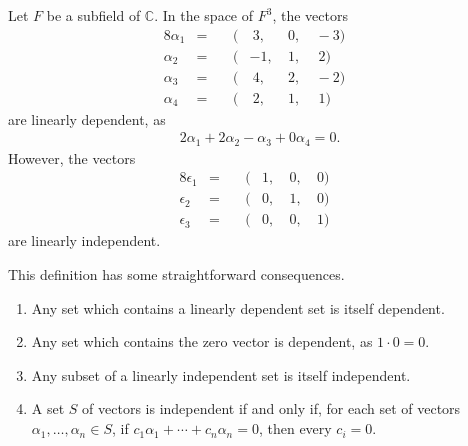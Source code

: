 \documentclass[12pt]{article}
\begin{document}
\begin{exm}
  Let $F$ be a subfield of $\mathbb{C}$. In the space of $F^3$, the vectors
  \begin{alignat*}{8}
    \alpha_1 &=&\ &(&\ 3,&\ 0,&\ -3)&\\
    \alpha_2 &=&\ &(&-1,&\ 1,&\ \ 2)&\\
    \alpha_3 &=&\ &(&\ 4,&\ 2,&\ -2)&\\
    \alpha_4 &=&\ &(&\ 2,&\ 1,&\ \ 1)&
  \end{alignat*}
  are linearly dependent, as
  \begin{align*}
    2\alpha_1 + 2\alpha_2 - \alpha_3 + 0\alpha_4 = 0.
  \end{align*}
  However, the vectors
  \begin{alignat*}{8}
    \epsilon_1 &=&\ &(&1,&\ 0,&\ 0)&\\
    \epsilon_2 &=&\ &(&0,&\ 1,&\ 0)&\\
    \epsilon_3 &=&\ &(&0,&\ 0,&\ 1)&
  \end{alignat*}
  are linearly independent.
\end{exm}

\begin{comm}
  This definition has some straightforward consequences.

  \begin{enumerate}
    \item
      Any set which contains a linearly dependent set is itself dependent.
    \item
      Any set which contains the zero vector is dependent, as $1 \cdot 0 = 0$.
    \item
      Any subset of a linearly independent set is itself independent.
    \item
      A set $S$ of vectors is independent if and only if, for each set of vectors
      $\alpha_1,\ldots,\alpha_n \in S$, if $c_1\alpha_1 + \cdots + c_n\alpha_n = 0$,
      then every $c_i = 0$.
  \end{enumerate}
\end{comm}
\end{document}
